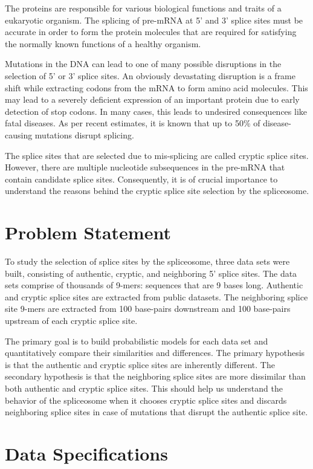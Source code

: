 \documentclass[12pt,a4paper]{article}
\begin{document}
	The proteins are responsible for various biological functions and traits of a eukaryotic organism. The splicing of pre-mRNA at 5’ and 3’ splice sites must be accurate in order to form the protein molecules that are required for satisfying the normally known functions of a healthy organism. \par
	Mutations in the DNA can lead to one of many possible disruptions in the selection of 5’ or 3’ splice sites. An obviously devastating disruption is a frame shift while extracting codons from the mRNA to form amino acid molecules. This may lead to a severely deficient expression of an important protein due to early detection of stop codons. In many cases, this leads to undesired consequences like fatal diseases. As per recent estimates, it is known that up to 50\% of disease-causing mutations disrupt splicing. \par
	The splice sites that are selected due to mis-splicing are called cryptic splice sites. However, there are multiple nucleotide subsequences in the pre-mRNA that contain candidate splice sites. Consequently, it is of crucial importance to understand the reasons behind the cryptic splice site selection by the spliceosome.
	

	\section{\large Problem Statement} \label{sec:problem}
	To study the selection of splice sites by the spliceosome, three data sets were built, consisting of authentic, cryptic, and neighboring 5’ splice sites. The data sets comprise of thousands of 9-mers: sequences that are 9 bases long. Authentic and cryptic splice sites are extracted from public datasets. The neighboring splice site 9-mers are extracted from 100 base-pairs downstream and 100 base-pairs upstream of each cryptic splice site. \par
	The primary goal is to build probabilistic models for each data set and quantitatively compare their similarities and differences. The primary hypothesis is that the authentic and cryptic splice sites are inherently different. The secondary hypothesis is that the neighboring splice sites are more dissimilar than both authentic and cryptic splice sites. This should help us understand the behavior of the spliceosome when it chooses cryptic splice sites and discards neighboring splice sites in case of mutations that disrupt the authentic splice site.
    
    \section{Data Specifications} \label{sec-dataspec}
\end{document}

